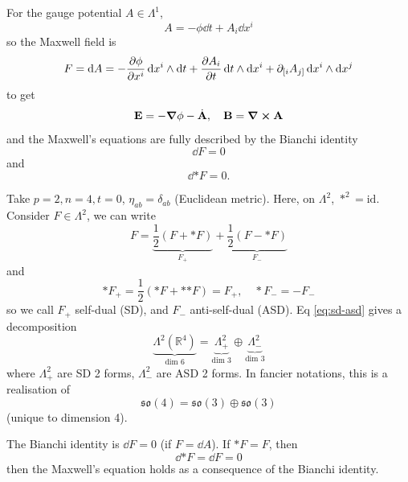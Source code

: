 \documentclass[a4paper,11pt]{article}
\begin{document}
\begin{ex}
        For the gauge potential $A\in \Lambda^1$, 
        \begin{equation}
            A = - \phi \dd{t} + A_i \dd{x^i}
        \end{equation}
        so the Maxwell field is 
        \begin{equation}
            F = \dd{A} = -\pdv{\phi}{x^i} \dd{x^i} \wedge \dd{t} + \pdv{A_i}{t} \dd{t} \wedge \dd{x^i} + \partial_{[i} A_{j]} \dd{x^i} \wedge \dd{x^j}
        \end{equation}
        to get 
        \begin{equation}
            \vb E = - \grad \phi - \dot{\vb A}, \quad \vb B = \curl \vb A
        \end{equation}
        and the Maxwell's equations are fully described by the Bianchi identity
        \begin{equation}
            \dd{F} = 0
        \end{equation}
        and 
        \begin{equation}
            \dd{* F} = 0.
        \end{equation}
    \end{ex}

    \begin{ex}
        Take $p=2, n=4, t=0$, $\eta_{ab} = \delta_{ab}$ (Euclidean metric). Here, on $\Lambda^2$, $*^2 = \text{id}$. Consider $F \in \Lambda^2$, we can write 
        \begin{equation}
            F = \underbrace{\frac{1}{2} (F + *F)}_{F_+} + \underbrace{\frac{1}{2} (F - *F)}_{F_-} \label{eq:sd-asd}
        \end{equation}
        and 
        \begin{equation}
            * F_+ = \frac{1}{2} (* F + *{*F}) = F_+, \quad * F_- = - F_-
        \end{equation}
        so we call $F_+$ self-dual (SD), and $F_-$ anti-self-dual (ASD). Eq \eqref{eq:sd-asd} gives a decomposition 
        \begin{equation}
            \underbrace{\Lambda^2(\mathbb{R}^4)}_{\text{dim 6}} = \underbrace{\Lambda^2_+}_{\text{dim 3}} \oplus \underbrace{\Lambda^2_-}_{\text{dim 3}}
        \end{equation}
        where $\Lambda^2_+$ are SD 2 forms, $\Lambda^2_-$ are ASD 2 forms. In fancier notations, this is a realisation of 
        \begin{equation}
            \mathfrak{so}(4) = \mathfrak{so}(3) \oplus \mathfrak{so}(3)
        \end{equation}
        (unique to dimension 4).

        The Bianchi identity is $\dd{F} = 0$ (if $F = \dd{A}$). If $*F = F$, then 
        \begin{equation}
            \dd{*F} = \dd{F} = 0
        \end{equation}
        then the Maxwell's equation holds as a consequence of the Bianchi identity. 
    \end{ex}
    
\end{document}
